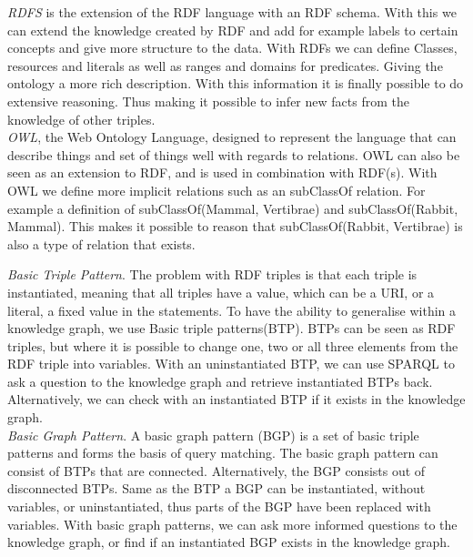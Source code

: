\documentclass[11pt,letterpaper ,oneside ]{book}
\begin{document}
	\textit{RDFS} \cite{RDFSchema:2014} is the extension of the RDF language with an RDF schema. With this we can extend the knowledge created by RDF and add for example labels to certain concepts and give more structure to the data. With RDFs we can define Classes, resources and literals as well as ranges and domains for predicates. Giving the ontology a more rich description. With this information it is finally possible to do extensive reasoning. Thus making it possible to infer new facts from the knowledge of other triples.\\
	
	\textit{OWL}\cite{OWLPrimer:2012}, the Web Ontology Language, designed to represent the language that can describe things and set of things well with regards to relations. OWL can also be seen as an extension to RDF, and is used in combination with RDF(s). With OWL we define more implicit relations such as an subClassOf relation. For example a definition of subClassOf(Mammal, Vertibrae) and subClassOf(Rabbit, Mammal). This makes it possible to reason that subClassOf(Rabbit, Vertibrae) is also a type of relation that exists. 
	
	\textit{Basic Triple Pattern}. The problem with RDF triples is that each triple is instantiated, meaning that all triples have a value, which can be a URI, or a literal,  a fixed value in the statements. 
	To have the ability to generalise within a knowledge graph, we use Basic triple patterns(BTP). BTPs can be seen as RDF triples, but where it is possible to change one, two or all three elements from the RDF triple into variables. With an uninstantiated BTP, we can use SPARQL to ask a question to the knowledge graph and retrieve instantiated BTPs back. Alternatively, we can check with an instantiated BTP if it exists in the knowledge graph.\\
	
	\textit{Basic Graph Pattern}. A basic graph pattern (BGP) is a set of basic triple patterns and forms the basis of query matching. The basic graph pattern
	can consist of BTPs that are connected.
	Alternatively, the BGP consists out of disconnected BTPs. Same as the BTP a BGP can be instantiated, without variables, or uninstantiated, thus parts of the BGP have been replaced with variables. With basic graph patterns, we can ask more informed questions to the knowledge graph, or find if an instantiated BGP exists in the knowledge graph.\\
	
\end{document}
